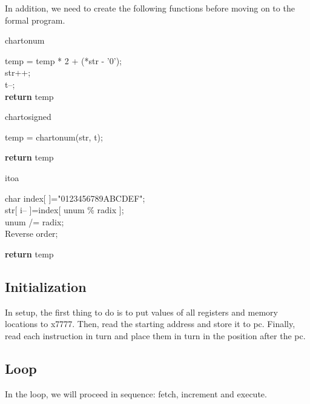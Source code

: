 \documentclass[20pt]{ctexart}
\begin{document}
In addition, we need to create the following functions before moving on to the formal program.

\begin{algorithm}[H]
	\caption{chartonum}
	\small

        {
            temp = temp * 2 + (*str - '0');\\
            str++;\\
            t--;\\
        }
    \textbf{return} temp
\end{algorithm}

\begin{algorithm}[H]
	\caption{chartosigned}
	\small

        temp = chartonum(str, t); \\ 

    \textbf{return} temp
\end{algorithm}

\begin{algorithm}[H]
	\caption{itoa}
	\small
        char index[  ]="0123456789ABCDEF";\\
        {
                str[ i-- ]=index[ unum \% radix ];\\
                unum /= radix;\\
        }
        {       
                Reverse order;\\
        }

    \textbf{return} temp
\end{algorithm}

\subsection{Initialization}
In setup, the first thing to do is to put values of all registers and memory locations to x7777.
Then, read the starting address and store it to pc. 
Finally, read each instruction in turn and place them in turn in the position after the pc.

\subsection{Loop}
In the loop, we will proceed in sequence: fetch, increment and execute.
\end{document}
